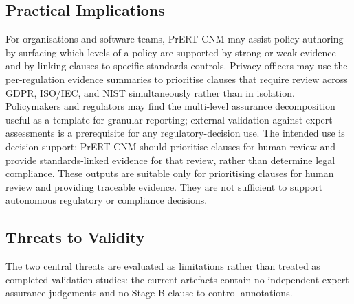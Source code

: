 \documentclass[final,3p,times,twocolumn]{elsarticle}
\begin{document}
	\subsection{Practical Implications}
	For organisations and software teams, PrERT-CNM may assist policy authoring by
	surfacing which levels of a policy are supported by strong or weak evidence and
	by linking clauses to specific standards controls. Privacy officers may use
	the per-regulation evidence summaries to prioritise clauses that require
	review across GDPR, ISO/IEC, and NIST simultaneously rather than in isolation.
	Policymakers and regulators may find the multi-level assurance decomposition useful
	as a template for granular reporting; external validation against expert
	assessments is a prerequisite for any regulatory-decision use. The intended use
	is decision support: PrERT-CNM should prioritise clauses for human review and
	provide standards-linked evidence for that review, rather than determine legal
	compliance.
	These outputs are suitable only for prioritising clauses for human review and
	providing traceable evidence. They are not sufficient to support autonomous
	regulatory or compliance decisions.
	\subsection{Threats to Validity}
	The two central threats are evaluated as limitations rather than treated as
	completed validation studies: the current artefacts contain no independent
	expert assurance judgements and no Stage-B clause-to-control annotations.
\end{document}
